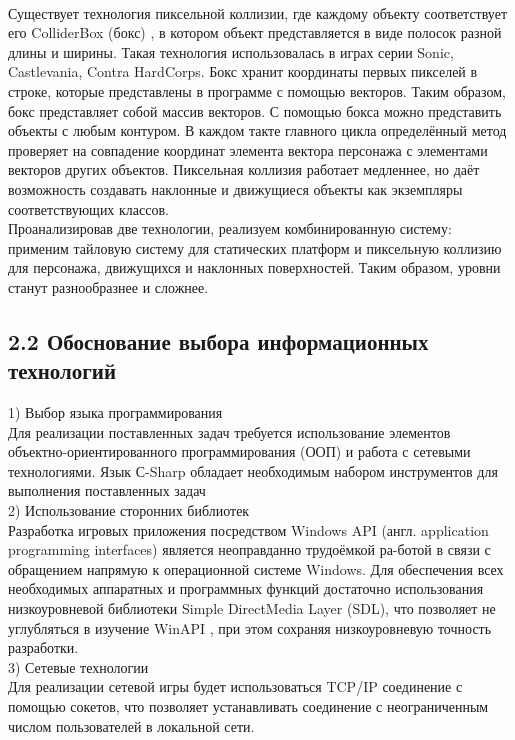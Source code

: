 \documentclass[14pt,a4paper]{extreport}
\begin{document}
\\\hspace{4ex}Существует технология пиксельной коллизии, где каждому объекту соответствует его ColliderBox (бокс) , в котором объект представляется в виде полосок разной длины и ширины. Такая технология использовалась в играх серии Sonic, Castlevania, Contra HardCorps.  Бокс хранит координаты первых пикселей в строке, которые представлены в программе с помощью векторов. Таким образом, бокс представляет собой массив векторов.  С помощью бокса можно представить объекты с любым контуром. В каждом такте главного цикла определённый метод проверяет на совпадение координат элемента вектора персонажа с элементами векторов других объектов. Пиксельная коллизия работает медленнее, но даёт возможность создавать наклонные и движущиеся объекты как экземпляры соответствующих классов.
\\\hspace{4ex}Проанализировав две технологии, реализуем комбинированную систему: применим тайловую систему для статических платформ и пиксельную коллизию для персонажа, движущихся и наклонных поверхностей. Таким образом, уровни станут разнообразнее и сложнее.

	\subsection*{\normalsize\hspace{4ex}2.2 Обоснование выбора информационных технологий}
	\hspace{4ex}1)	Выбор языка программирования
\\Для реализации поставленных задач требуется использование элементов объектно-ориентированного программирования (ООП) и работа с сетевыми технологиями. Язык С-Sharp обладает необходимым набором инструментов для выполнения поставленных задач
\\\hspace{4ex}2)	Использование сторонних библиотек
\\Разработка игровых приложения посредством Windows API (англ. application programming interfaces) является неоправданно трудоёмкой ра-ботой в связи с обращением напрямую к операционной системе Windows. Для обеспечения всех необходимых аппаратных и программных функций достаточно использования низкоуровневой библиотеки Simple DirectMedia Layer (SDL), что позволяет не углубляться в изучение WinAPI , при этом сохраняя низкоуровневую точность разработки.
\\\hspace{4ex} 3)	Сетевые технологии
\\\hspace{4ex}Для реализации сетевой игры будет использоваться TCP/IP соединение с помощью сокетов, что позволяет устанавливать соединение с неограниченным числом пользователей в локальной сети.
\end{document}

